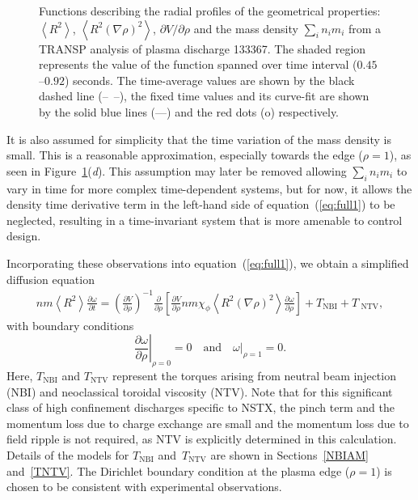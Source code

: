 \documentclass[12pt,lot, lof]{puthesis}
\begin{document}
\begin{figure}
\caption{Functions describing the radial profiles of the geometrical properties: $\left< R^2 \right>$, $\left< R^2 (\nabla\rho)^2 \right>$, $\partial V/\partial \rho$ and  the mass density $ \sum_i n_i m_i $ from a TRANSP analysis of plasma discharge 133367.  The shaded region represents the value of the function spanned over time interval ($0.45$--$0.92$) seconds. The time-average values are shown by the black dashed line (--~--), the fixed time values and its curve-fit are shown by the solid blue lines (---) and the red dots (o) respectively.}
\label{fig:geofunc}
\end{figure}

It is also assumed for simplicity that the time variation of the mass density is
small.  This is a reasonable approximation, especially towards the edge ($\rho=1$), as seen in Figure~{\ref{fig:geofunc}}(\emph{d}).
This assumption may later be removed allowing $ \sum_i n_i m_i $  to vary in
time for more complex time-dependent systems, but for now, it allows the density
time derivative term in the left-hand side of equation~(\ref{eq:full1}) to be
neglected, resulting in a time-invariant system that is more amenable to control
design.
 
 Incorporating these observations into equation~(\ref{eq:full1}), we obtain a simplified diffusion equation
\begin{multline}
 n m \left<R^2\right>
 \frac{\partial \omega}{\partial t} 
 = \left( \frac{\partial V}{\partial\rho}\right)^{-1}
   \frac{\partial}{\partial \rho} 
   \left[\frac{\partial V}{\partial \rho} n m \chi_\phi 
   \left< R^2 (\nabla \rho)^2\right> 
   \frac{\partial\omega}{\partial\rho}\right] + T_\text{NBI} + T_\text{ NTV},
		\label{model0}
\end{multline}
with boundary conditions
\begin{equation}
\left.\frac{\partial\omega}{\partial\rho}\right|_{\rho=0} = 0 
\quad \text{and} \quad 
\left.\omega\right|_{\rho=1} = 0.
\label{bc0}
\end{equation}
Here, $T_\text{NBI} $ and $T_\text{NTV}$ represent the torques
arising from neutral beam injection (NBI) and neoclassical toroidal viscosity
(NTV). Note that for this significant class of high confinement discharges specific to NSTX, the
pinch term and  the momentum loss due to charge exchange are small \cite{Solomon08, Kaye09} and the
momentum loss due to  field ripple is not required, as NTV is explicitly
determined in this calculation. Details of the models for $T_\text{NBI}$
and~$T_\text{NTV}$ are shown in Sections~\ref{NBIAM} and~\ref{TNTV}.  The
Dirichlet boundary condition at the plasma edge ($\rho=1$) is chosen to be
consistent with experimental observations.
  
\end{document}
